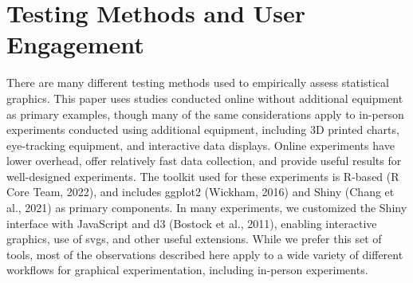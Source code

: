\documentclass[
  10pt,
  letterpaper,
  DIV=11,
  numbers=noendperiod]{scrartcl}
\begin{document}
\section{Testing Methods and User Engagement}\label{sec-testing-methods}

There are many different testing methods used to empirically assess
statistical graphics. This paper uses studies conducted online without
additional equipment as primary examples, though many of the same
considerations apply to in-person experiments conducted using additional
equipment, including 3D printed charts, eye-tracking equipment, and
interactive data displays. Online experiments have lower overhead, offer
relatively fast data collection, and provide useful results for
well-designed experiments. The toolkit used for these experiments is
R-based (R Core Team, 2022), and includes ggplot2 (Wickham, 2016) and
Shiny (Chang et al., 2021) as primary components. In many experiments,
we customized the Shiny interface with JavaScript and d3 (Bostock et
al., 2011), enabling interactive graphics, use of svgs, and other useful
extensions. While we prefer this set of tools, most of the observations
described here apply to a wide variety of different workflows for
graphical experimentation, including in-person experiments.
\end{document}
